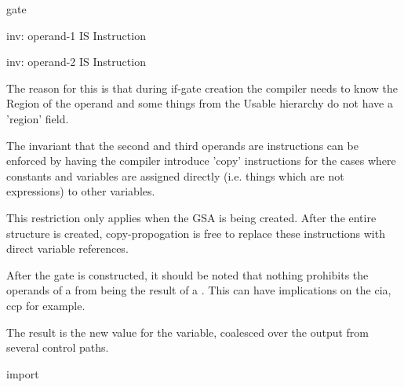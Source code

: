 \begin{instruction}{gate}
\begin{notes}
    inv: operand-1 IS Instruction

    inv: operand-2 IS Instruction

    The reason for this is that during if-gate creation the compiler
    needs to know the Region of the operand and some things from the
    Usable hierarchy do not have a 'region' field.

    The invariant that the second and third operands are instructions
    can be enforced by having the compiler introduce 'copy'
    instructions for the cases where constants and variables are
    assigned directly (i.e.  things which are not expressions) to
    other variables.

    This restriction only applies when the GSA is being created.
    After the entire structure is created, copy-propogation is free to
    replace these instructions with direct variable references.

    After the gate is constructed, it should be noted that nothing
    prohibits the operands of a  from being the result
    of a .  This can have implications on the \ac{cia},
    \ac{ccp} for example.

  \end{notes}

  \begin{results}
  \item The result is the new value for the variable, coalesced over
    the output from several control paths.
  \end{results}

  \begin{operands}
  \item {}
  \item {}
  \end{operands}
\end{instruction}

\begin{instruction}{import}

  \nresults

  \begin{operands}
  \item {}
  \end{operands}
\end{instruction}



